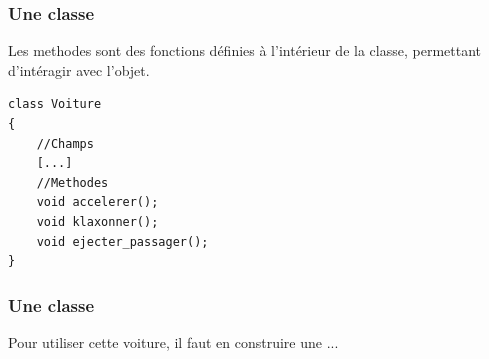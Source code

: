 \documentclass{beamer}
\begin{document}
\begin{frame}[fragile]
\frametitle{Une classe}
Les methodes sont des fonctions définies à l'intérieur de la classe, permettant d'intéragir avec l'objet.
\begin{lstlisting}
class Voiture
{
    //Champs
    [...]
    //Methodes
    void accelerer();
    void klaxonner();
    void ejecter_passager();
}
\end{lstlisting}
\end{frame}

\begin{frame}[fragile]
\frametitle{Une classe}
Pour utiliser cette voiture, il faut en construire une ...
\end{frame}







\end{document}
